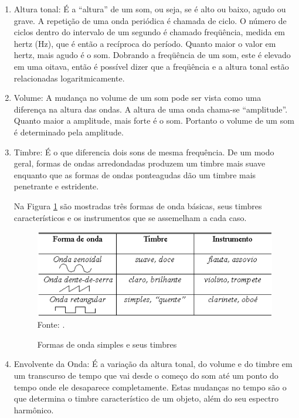 \begin{enumerate}
\item Altura tonal: É a “altura” de um som, ou seja, se é alto ou baixo, agudo ou grave. A repetição de uma onda periódica é chamada de ciclo. O número de ciclos dentro do intervalo de um segundo é chamado freqüência, medida em hertz (Hz), que é então a recíproca do período. Quanto maior o valor em hertz, mais agudo é o som. Dobrando a freqüência de um som, este é elevado em uma oitava, então é possível dizer que a freqüência e a altura tonal estão relacionadas logaritmicamente.

\item Volume: A mudança no volume de um som pode ser vista como uma diferença na altura das ondas. A altura de uma onda chama-se “amplitude”. Quanto maior a amplitude, mais forte é o som. Portanto o volume de um som é determinado pela amplitude.

\item Timbre: É o que diferencia dois sons de mesma frequência. De um modo geral, formas de ondas arredondadas produzem um timbre mais suave enquanto que as formas de ondas ponteagudas dão um timbre mais penetrante e estridente.

Na Figura \ref{fig:ondaTimbre} são mostradas três formas de onda básicas, seus timbres característicos e os instrumentos que se assemelham a cada caso.

\begin{figure}[!htb]
   \centering
   \caption{Formas de onda simples e seus timbres}\label{fig:ondaTimbre} 
   \includegraphics[scale=0.6]{figuras/ondaTimbre.png}
   Fonte: \cite{miletto2004}.
\end{figure}

\item Envolvente da Onda: É a variação da altura tonal, do volume e do timbre em um transcurso de tempo que vai desde o começo do som até um ponto do tempo onde ele desaparece completamente. Estas mudanças no tempo são o que determina o timbre característico de um objeto, além do seu espectro harmônico.
\end{enumerate}

